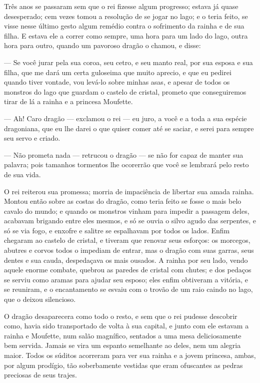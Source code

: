 Três anos se passaram sem que o rei fizesse algum progresso; estava já
quase desesperado; cem vezes tomou a resolução de se jogar no lago; e
o teria feito, se visse nesse último gesto algum remédio contra o
sofrimento da rainha e de sua filha. E estava ele a correr como
sempre, uma hora para um lado do lago, outra hora para outro, quando
um pavoroso dragão o chamou, e disse:

— Se você jurar pela sua coroa, seu cetro, e seu manto real, por sua
esposa e sua filha, que me dará um certa guloseima que muito aprecio,
e que eu pedirei quando tiver vontade, vou levá-lo sobre minhas asas,
e apesar de todos os monstros do lago que guardam o castelo de
cristal, prometo que conseguiremos tirar de lá a rainha e a princesa
Moufette. 

— Ah! Caro dragão — exclamou o rei — eu juro, a você e a toda a sua
espécie dragoniana, que eu lhe darei o que quiser comer até se
saciar, e serei para sempre seu servo e criado.

— Não prometa nada — retrucou o dragão — se não for capaz de manter
sua palavra; pois tamanhos tormentos lhe ocorerrão que você se
lembrará pelo resto de sua vida. 

O rei reiterou sua promessa; morria de impaciência de libertar sua
amada rainha. Montou então sobre as costas do dragão, como teria
feito se fosse o mais belo cavalo do mundo; e quando os monstros
vinham para impedir a passagem deles, acabavam brigando entre eles
mesmos, e só se ouvia o silvo agudo das serpentes, e só se via fogo,
e enxofre e salitre se espalhavam por todos os lados. Enfim chegaram
ao castelo de cristal, e tiveram que renovar seus esforços: os
morcegos, abutres e corvos todos o impediam de entrar, mas o dragão
com suas garras, seus dentes e sua cauda, despedaçava os mais
ousados. A rainha por seu lado, vendo aquele enorme combate, quebrou
as paredes de cristal com chutes; e dos pedaços se serviu como aramas
para ajudar seu esposo; eles enfim obtiveram a vitória, e se
reuniram, e o encantamento se esvaiu com o trovão de um raio caindo
no lago, que o deixou silencioso. 

 O dragão desaparecera como todo o resto, e sem que o rei pudesse
descobrir como, havia sido transportado de volta à sua capital, e
junto com ele estavam a rainha e Moufette, num salão magnífico,
sentados a uma mesa deliciosamente bem servida. Jamais se vira um
espanto semelhante ao deles, nem um alegria maior. Todos os súditos
acorreram para ver sua rainha e a jovem princesa, ambas, por algum
prodígio, tão soberbamente vestidas que eram ofuscantes as pedras
preciosas de seus trajes.

